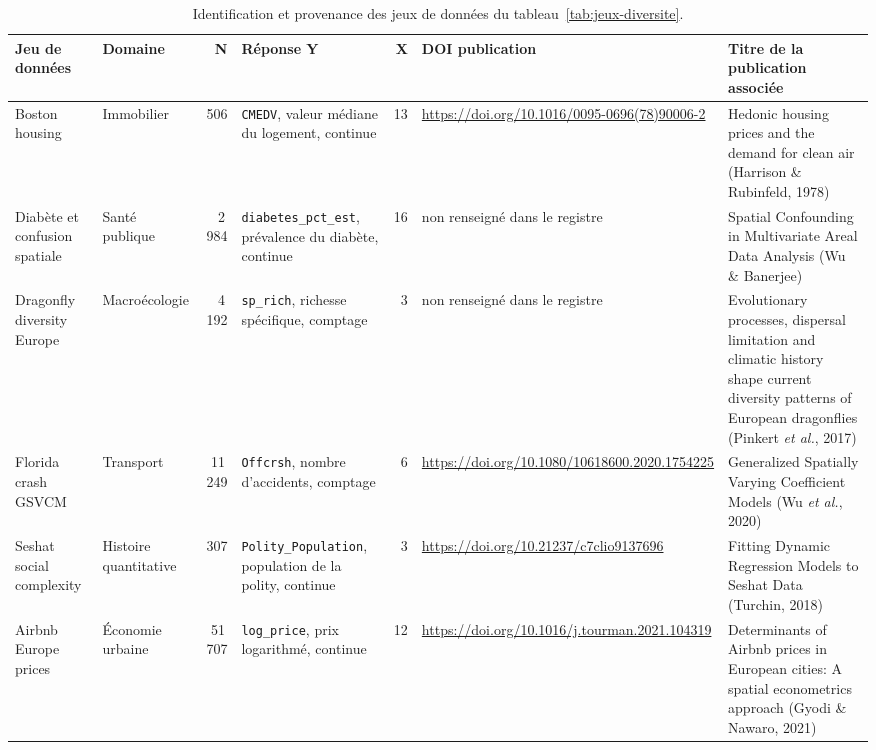 \documentclass[11pt,a4paper]{article}
\begin{document}
\begin{table}
\centering
\footnotesize
\begin{tabularx}{\textheight}{@{}p{2.6cm}p{2.6cm}rXrp{2.6cm}X@{}}
\toprule
Jeu de données & Domaine & N & Réponse Y & X & DOI publication & Titre de la publication associée \\
\midrule
Boston housing & Immobilier & 506 & \texttt{CMEDV}, valeur médiane du logement, continue & 13 & \url{https://doi.org/10.1016/0095-0696(78)90006-2} & Hedonic housing prices and the demand for clean air (Harrison \& Rubinfeld, 1978) \\
Diabète et confusion spatiale & Santé publique & 2\,984 & \texttt{diabetes\_pct\_est}, prévalence du diabète, continue & 16 & non renseigné dans le registre\footnotemark[1] & Spatial Confounding in Multivariate Areal Data Analysis (Wu \& Banerjee) \\
Dragonfly diversity Europe & Macroécologie & 4\,192 & \texttt{sp\_rich}, richesse spécifique, comptage & 3 & non renseigné dans le registre\footnotemark[2] & Evolutionary processes, dispersal limitation and climatic history shape current diversity patterns of European dragonflies (Pinkert \textit{et al.}, 2017) \\
Florida crash GSVCM & Transport & 11\,249 & \texttt{Offcrsh}, nombre d'accidents, comptage & 6 & \url{https://doi.org/10.1080/10618600.2020.1754225} & Generalized Spatially Varying Coefficient Models (Wu \textit{et al.}, 2020) \\
Seshat social complexity & Histoire quantitative & 307 & \texttt{Polity\_Population}, population de la polity, continue & 3 & \url{https://doi.org/10.21237/c7clio9137696} & Fitting Dynamic Regression Models to Seshat Data (Turchin, 2018) \\
Airbnb Europe prices & Économie urbaine & 51\,707 & \texttt{log\_price}, prix logarithmé, continue & 12 & \url{https://doi.org/10.1016/j.tourman.2021.104319} & Determinants of Airbnb prices in European cities: A spatial econometrics approach (Gyodi \& Nawaro, 2021) \\
\bottomrule
\end{tabularx}
\caption{Identification et provenance des jeux de données du tableau~\ref{tab:jeux-diversite}.}
\label{tab:jeux-diversite-detail-a}
\end{table}

\end{document}
